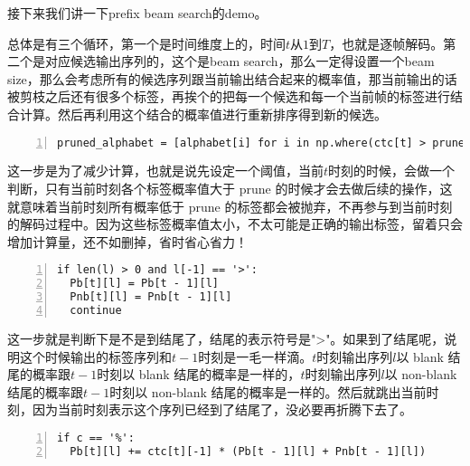 接下来我们讲一下prefix beam search的demo。

总体是有三个循环，第一个是时间维度上的，时间$t$从$1$到$T$，也就是逐帧解码。第二个是对应候选输出序列的，这个是beam search，那么一定得设置一个beam size，那么会考虑所有的候选序列跟当前输出结合起来的概率值，那当前输出的话被剪枝之后还有很多个标签，再挨个的把每一个候选和每一个当前帧的标签进行结合计算。然后再利用这个结合的概率值进行重新排序得到新的候选。

\begin{lstlisting}[language = shell, numbers=left, 
         numberstyle=\tiny,keywordstyle=\color{blue!70},
         commentstyle=\color{red!50!green!50!blue!50},frame=shadowbox,
         rulesepcolor=\color{red!20!green!20!blue!20},basicstyle=\ttfamily]
pruned_alphabet = [alphabet[i] for i in np.where(ctc[t] > prune)[0]]
\end{lstlisting}

这一步是为了减少计算，也就是说先设定一个阈值，当前$t$时刻的时候，会做一个判断，只有当前时刻各个标签概率值大于 prune 的时候才会去做后续的操作，这就意味着当前时刻所有概率低于 prune 的标签都会被抛弃，不再参与到当前时刻的解码过程中。因为这些标签概率值太小，不太可能是正确的输出标签，留着只会增加计算量，还不如删掉，省时省心省力！

\begin{lstlisting}[language = shell, numbers=left, 
         numberstyle=\tiny,keywordstyle=\color{blue!70},
         commentstyle=\color{red!50!green!50!blue!50},frame=shadowbox,
         rulesepcolor=\color{red!20!green!20!blue!20},basicstyle=\ttfamily]
if len(l) > 0 and l[-1] == '>':
  Pb[t][l] = Pb[t - 1][l]
  Pnb[t][l] = Pnb[t - 1][l]
  continue 
\end{lstlisting}

这一步就是判断下是不是到结尾了，结尾的表示符号是">"。如果到了结尾呢，说明这个时候输出的标签序列和$t-1$时刻是一毛一样滴。$t$时刻输出序列$l$以 blank 结尾的概率跟$t-1$时刻以 blank 结尾的概率是一样的，$t$时刻输出序列$l$以 non-blank 结尾的概率跟$t-1$时刻以 non-blank 结尾的概率是一样的。然后就跳出当前时刻，因为当前时刻表示这个序列已经到了结尾了，没必要再折腾下去了。
 
\begin{lstlisting}[language = shell, numbers=left, 
         numberstyle=\tiny,keywordstyle=\color{blue!70},
         commentstyle=\color{red!50!green!50!blue!50},frame=shadowbox,
         rulesepcolor=\color{red!20!green!20!blue!20},basicstyle=\ttfamily]
if c == '%':
  Pb[t][l] += ctc[t][-1] * (Pb[t - 1][l] + Pnb[t - 1][l])
\end{lstlisting}

